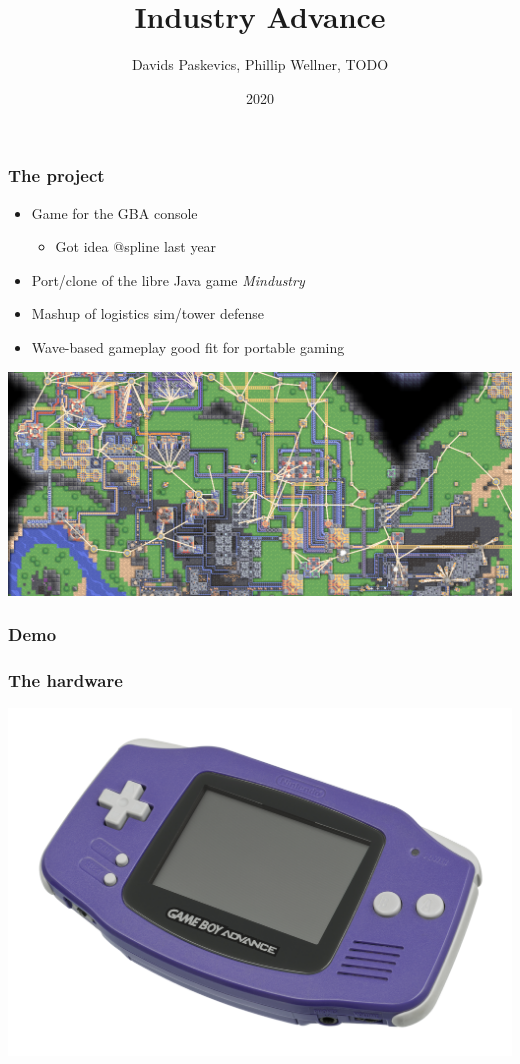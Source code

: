 \documentclass{beamer}
\title{Industry Advance}
\author{Davids Paskevics, Phillip Wellner, TODO}
\institute{FU Berlin}
\date{2020}
\begin{document}
\frame{\titlepage}

\begin{frame}
	\frametitle{The project}
	\begin{itemize}
		\item Game for the GBA console \begin{itemize}
			      \item Got idea @spline last year
		      \end{itemize}
		\item Port/clone of the libre Java game \emph{Mindustry}
		\item Mashup of logistics sim/tower defense
		\item Wave-based gameplay good fit for portable gaming
	\end{itemize}
\end{frame}

\begin{frame}
	\includegraphics[scale=0.4]{images/mindustry.png}
\end{frame}

\begin{frame}
	\frametitle{Demo}
\end{frame}



\begin{frame}
	\frametitle{The hardware}
	\includegraphics[scale=0.28]{images/Nintendo-Game-Boy-Advance-Purple-FL.jpg}
\end{frame}
\end{document}
